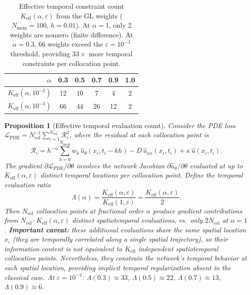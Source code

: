 \documentclass[11pt]{article}
\newcommand{\Lcal}{\mathcal{L}}
\newcommand{\Rcal}{\mathcal{R}}
\newcommand{\Ncol}{N_{\mathrm{col}}}
\newtheorem{Proposition}{Proposition}
\begin{document}
\begin{table}[t]
\centering
\caption{Effective temporal constraint count $K_{\mathrm{eff}}(\alpha, \varepsilon)$ from the GL weights ($N_{\mathrm{mem}} = 100$, $h = 0.01$). At $\alpha = 1$, only 2 weights are nonzero (finite difference). At $\alpha = 0.3$, 66 weights exceed the $\varepsilon = 10^{-3}$ threshold, providing $33\times$ more temporal constraints per collocation point.}
\label{tab:keff}
\begin{tabular}{rccccc}
\toprule
$\alpha$ & 0.3 & 0.5 & 0.7 & 0.9 & 1.0 \\
\midrule
$K_{\mathrm{eff}}(\alpha, 10^{-2})$ & 12 & 10 & 7 & 4 & 2 \\
$K_{\mathrm{eff}}(\alpha, 10^{-3})$ & 66 & 44 & 26 & 12 & 2 \\
\bottomrule
\end{tabular}
\end{table}

\begin{Proposition}[Effective temporal evaluation count]
\label{prop:amplification}
Consider the PDE loss $\Lcal_{\mathrm{PDE}} = \Ncol^{-1} \sum_{i=1}^{\Ncol} \Rcal_i^2$, where the residual at each collocation point is
\[
\Rcal_i = h^{-\alpha} \sum_{k=0}^{N_{\mathrm{mem}}} w_k\, \hat{u}_\theta(x_i, t_i - kh) - D\,\hat{u}_{xx}(x_i, t_i) + \kappa\,\hat{u}(x_i, t_i).
\]
The gradient $\partial \Lcal_{\mathrm{PDE}} / \partial \theta$ involves the network Jacobian $\partial \hat{u}_\theta / \partial \theta$ evaluated at up to $K_{\mathrm{eff}}(\alpha, \varepsilon)$ distinct temporal locations per collocation point. Define the \emph{temporal evaluation ratio}
\begin{equation}
\label{eq:lambda}
\Lambda(\alpha) = \frac{K_{\mathrm{eff}}(\alpha, \varepsilon)}{K_{\mathrm{eff}}(1, \varepsilon)} = \frac{K_{\mathrm{eff}}(\alpha, \varepsilon)}{2}.
\end{equation}
Then $\Ncol$ collocation points at fractional order $\alpha$ produce gradient contributions from $\Ncol \cdot K_{\mathrm{eff}}(\alpha, \varepsilon)$ distinct spatiotemporal evaluations, vs.\ only $2\Ncol$ at $\alpha = 1$. \textbf{Important caveat:} these additional evaluations share the same spatial location $x_i$ (they are temporally correlated along a single spatial trajectory), so their information content is \emph{not} equivalent to $K_{\mathrm{eff}}$ independent spatiotemporal collocation points. Nevertheless, they constrain the network's temporal behavior at each spatial location, providing implicit temporal regularization absent in the classical case. At $\varepsilon = 10^{-3}$: $\Lambda(0.3) \approx 33$, $\Lambda(0.5) \approx 22$, $\Lambda(0.7) \approx 13$, $\Lambda(0.9) \approx 6$.
\end{Proposition}
\end{document}
